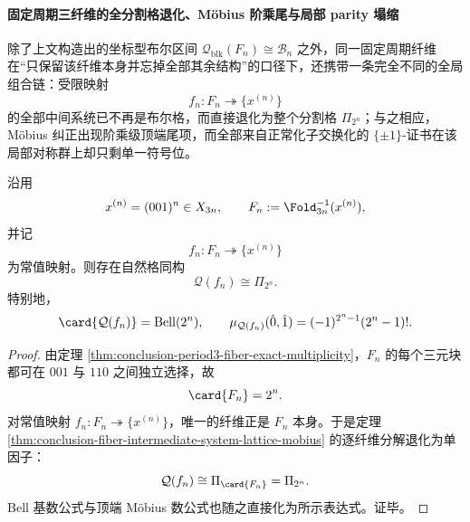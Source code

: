 \paragraph{固定周期三纤维的全分割格退化、Möbius 阶乘尾与局部 parity 塌缩}
除了上文构造出的坐标型布尔区间 \(\mathcal Q_{\mathrm{blk}}(F_n)\cong\mathcal B_n\) 之外，同一固定周期纤维在“只保留该纤维本身并忘掉全部其余结构”的口径下，还携带一条完全不同的全局组合链：受限映射
\[
f_n:F_n\twoheadrightarrow \{x^{(n)}\}
\]
的全部中间系统已不再是布尔格，而直接退化为整个分割格 \(\Pi_{2^n}\)；与之相应，Möbius 纠正出现阶乘级顶端尾项，而全部来自正常化子交换化的 \(\{\pm1\}\)-证书在该局部对称群上却只剩单一符号位。

\begin{theorem}[固定周期三纤维上的全中间系统格退化为分割格]\label{thm:conclusion-period3-fiber-full-lattice-partition}
沿用
\[
x^{(n)}=(001)^n\in X_{3n},
\qquad
F_n:=\Fold_{3n}^{-1}(x^{(n)}),
\]
并记
\[
f_n:F_n\twoheadrightarrow \{x^{(n)}\}
\]
为常值映射。则存在自然格同构
\[
\mathcal Q(f_n)\cong \Pi_{2^n}.
\]
特别地，
\[
\card{\mathcal Q(f_n)}=\mathrm{Bell}(2^n),
\qquad
\mu_{\mathcal Q(f_n)}(\hat0,\hat1)=(-1)^{2^n-1}(2^n-1)!.
\]
\end{theorem}
\begin{proof}
由定理 \ref{thm:conclusion-period3-fiber-exact-multiplicity}，\(F_n\) 的每个三元块都可在 \(001\) 与 \(110\) 之间独立选择，故
\[
\card{F_n}=2^n.
\]
对常值映射 \(f_n:F_n\twoheadrightarrow\{x^{(n)}\}\)，唯一的纤维正是 \(F_n\) 本身。于是定理 \ref{thm:conclusion-fiber-intermediate-system-lattice-mobius} 的逐纤维分解退化为单因子：
\[
\mathcal Q(f_n)\cong \Pi_{\card{F_n}}=\Pi_{2^n}.
\]
Bell 基数公式与顶端 Möbius 数公式也随之直接化为所示表达式。证毕。
\end{proof}

